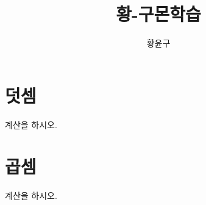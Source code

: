 \documentclass[17pt, twoside, openright]{memoir}
\author{황윤구}
\title{황-구몬학습}
\begin{document}
\maketitle
\chapter{덧셈}
계산을 하시오.
\begin{multicols}{2}
    \begin{enumerate}[label=\scriptsize{(\arabic*)}]
        
    \end{enumerate}    
\end{multicols}

\chapter{곱셈}
계산을 하시오.
\begin{multicols}{2}
    \begin{enumerate}[label=\scriptsize{(\arabic*)}]
        
    \end{enumerate}    
\end{multicols}
\end{document}
